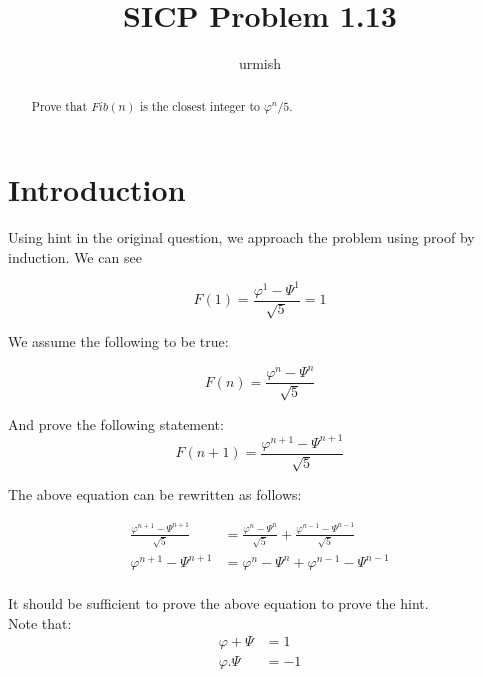 \documentclass{article}
\begin{document}
\title{SICP Problem 1.13}
\author{urmish}

\maketitle

\begin{abstract}
Prove that $Fib(n)$ is the closest integer to $\varphi^n/5.$
\end{abstract}

\section{Introduction}
Using hint in the original question, we approach the problem using proof by induction.
We can see 

\begin{equation}
    F(1) = \frac{\varphi^1 - \Psi^1}{\sqrt 5} = 1
\end{equation}

We assume the following to be true:

\begin{equation}
\label{assumption}
F(n) = \frac{\varphi^n - \Psi^n}{\sqrt 5}
\end{equation}

And prove the following statement:
\begin{equation}
F(n+1) = \frac{\varphi^{n+1} - \Psi^{n+1}}{\sqrt 5}
\end{equation}

The above equation can be rewritten as follows:

\begin{equation}
\begin{split}
\frac{\varphi^{n+1} - \Psi^{n+1}}{\sqrt 5} & = \frac{\varphi^n - \Psi^n}{\sqrt 5} + \frac{\varphi^{n-1} - \Psi^{n-1}}{\sqrt 5} \\
\varphi^{n+1} - \Psi^{n+1} & = \varphi^n - \Psi^n + \varphi^{n-1} - \Psi^{n-1} \\
\end{split}
\end{equation}

It should be sufficient to prove the above equation to prove the hint. \\

Note that:
\begin{equation}
\begin{split} 
\varphi + \Psi & = 1 \\
\varphi . \Psi & =  -1
\end{split}
\end{equation}
\end{document}
